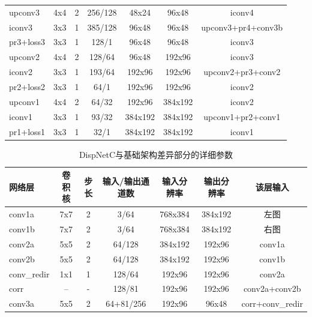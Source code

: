 \begin{table}[htbp]
\begin{scriptsize}
\begin{tabular}{|l|c c c|c c|c|}
			upconv3    & 4x4 & 2 & 256/128  & 48x24     & 96x48    & iconv4 \\
			iconv3        & 3x3 & 1 & 385/128  & 96x48    & 96x48    & upconv3+pr4+conv3b \\
			pr3+loss3 & 3x3 & 1 & 128/1        & 96x48    & 96x48    & iconv3 \\
			upconv2    & 4x4 & 2 & 128/64    & 96x48    & 192x96   & iconv3 \\
			iconv2        & 3x3 & 1 & 193/64   & 192x96   & 192x96   & upconv2+pr3+conv2 \\
			pr2+loss2  & 3x3 & 1 & 64/1        & 192x96   & 192x96    & iconv2 \\
			upconv1     & 4x4 & 2 & 64/32    & 192x96    & 384x192 & iconv2 \\
			iconv1        & 3x3 & 1 & 93/32     &384x192  & 384x192 & upconv1+pr2+conv1 \\
			pr1+loss1  & 3x3 & 1 & 32/1         & 384x192 & 384x192 & iconv1 \\\hline
		\end{tabular}
    \end{scriptsize}
\end{table}

\begin{table}[htbp]
	\centering
	\caption{DispNetC与基础架构差异部分的详细参数}
	\label{tab:4_1_DispNetC_architecture}
	\begin{scriptsize}
		\begin{tabular}{|l|c c c|c c|c|}\hline
			网络层  & 卷积核 & 步长 & 输入/输出通道数 & 输入分辨率 & 输出分辨率 & 该层输入 \\\hline
			conv1a             & 7x7 & 2 & 3/64                & 768x384 & 384x192 & 左图 \\
			conv1b             & 7x7 & 2 & 3/64                & 768x384 & 384x192 & 右图 \\
			conv2a             & 5x5 & 2 & 64/128           & 384x192  & 192x96    & conv1a \\
			conv2b             & 5x5 & 2 & 64/128           & 384x192  & 192x96    & conv1b \\
			conv\_redir      & 1x1 & 1 & 128/64            & 192x96    & 192x96    & conv2a \\
			corr                   & --   &  - & 128/81            & 192x96    & 192x96    & conv2a+conv2b \\
			conv3a            & 5x5 & 2 & 64+81/256    & 192x96    & 96x48      & corr+conv\_redir \\\hline
		\end{tabular}
	\end{scriptsize}
\end{table}

